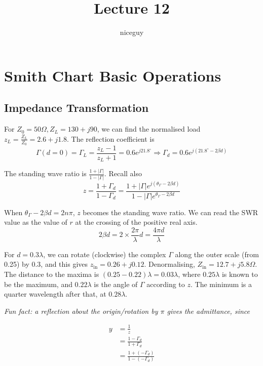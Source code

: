 \documentclass[12pt]{article}
\title{Lecture 12}
\author{niceguy}
\begin{document}
\maketitle

\section{Smith Chart Basic Operations}

\subsection{Impedance Transformation}

For $Z_0 = 50\unit{\Omega}, Z_L = 130 + j90$, we can find the normalised load $z_L = \frac{Z_L}{Z_0} = 2.6 + j1.8$. The reflection coefficient is
$$\Gamma(d=0) = \Gamma_L = \frac{z_L - 1}{z_L + 1} = 0.6e^{j21.8^\circ} \Rightarrow \Gamma_d = 0.6e^{j(21.8^\circ - 2\beta d)}$$

The standing wave ratio is $\frac{1 + |\Gamma|}{1 - |\Gamma|}$. Recall also
$$z = \frac{1 + \Gamma_d}{1 - \Gamma_d} = \frac{1 + |\Gamma|e^{j(\theta_\Gamma - 2\beta d)}}{1 - |\Gamma|e^{\theta_\Gamma - 2\beta d}}$$

When $\theta_\Gamma - 2\beta d = 2n\pi$, $z$ becomes the standing wave ratio. We can read the SWR value as the value of $r$ at the crossing of the positive real axis. \\

$$2\beta d = 2 \times \frac{2\pi}{\lambda} d = \frac{4\pi d}{\lambda}$$

For $d = 0.3\lambda$, we can rotate (clockwise) the complex $\Gamma$ along the outer scale (from 0.25) by 0.3, and this gives $z_{\text{in}} = 0.26 + j0.12$. Denormalising, $Z_{\text{in}} = 12.7 + j5.8\unit{\Omega}$. The distance to the maxima is $(0.25 - 0.22)\lambda = 0.03\lambda$, where $0.25\lambda$ is known to be the maximum, and $0.22\lambda$ is the angle of $\Gamma$ according to $z$. The minimum is a quarter wavelength after that, at $0.28\lambda$.

\textit{Fun fact: a reflection about the origin/rotation by $\pi$ gives the admittance, since}

\begin{align*}
    y &= \frac{1}{z} \\
      &= \frac{1 - \Gamma_d}{1 + \Gamma_d} \\
      &= \frac{1 + (-\Gamma_d)}{1 - (-\Gamma_d)}
\end{align*}
\end{document}
